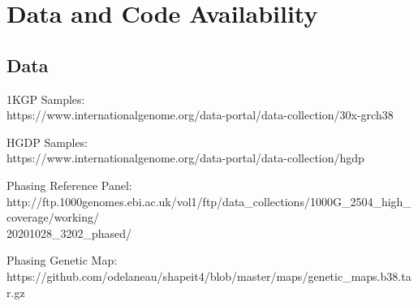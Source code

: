 \documentclass[11pt]{article}
\begin{document}







\vspace{8mm}
\section{Data and Code Availability}

\subsection{Data}

1KGP Samples: \\
https://www.internationalgenome.org/data-portal/data-collection/30x-grch38
\vspace{3mm}

\noindent
HGDP Samples: \\
https://www.internationalgenome.org/data-portal/data-collection/hgdp
\vspace{3mm}

\noindent
Phasing Reference Panel: \\
http://ftp.1000genomes.ebi.ac.uk/vol1/ftp/data\_collections/1000G\_2504\_high\_coverage/working/\\20201028\_3202\_phased/
\vspace{3mm}

\noindent
Phasing Genetic Map: \\
https://github.com/odelaneau/shapeit4/blob/master/maps/genetic\_maps.b38.tar.gz
\vspace{3mm}
\end{document}
